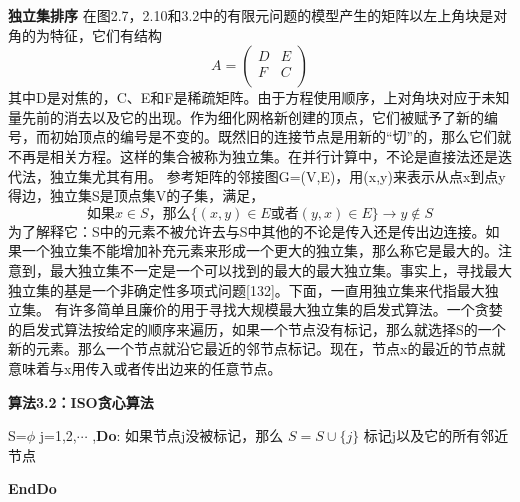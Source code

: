 \documentclass{article}
\begin{document}
\textbf{独立集排序}
在图2.7，2.10和3.2中的有限元问题的模型产生的矩阵以左上角块是对角的为特征，它们有结构
\begin{equation}
A=
\left (                 
\begin{array}{cc}   
    D&E\\  
    F&C \\ 
\end{array}
\right)   
\tag{3.3}
\end{equation}
其中D是对焦的，C、E和F是稀疏矩阵。由于方程使用顺序，上对角块对应于未知量先前的消去以及它的出现。作为细化网格新创建的顶点，它们被赋予了新的编号，而初始顶点的编号是不变的。既然旧的连接节点是用新的“切”的，那么它们就不再是相关方程。这样的集合被称为独立集。在并行计算中，不论是直接法还是迭代法，独立集尤其有用。
\newline
参考矩阵的邻接图G=(V,E)，用(x,y)来表示从点x到点y得边，独立集S是顶点集V的子集，满足，
$$\text{如果}x\in S\text{，那么}\{(x,y)\in E \text{或者} (y,x)\in E\} \rightarrow y \notin S$$
为了解释它：S中的元素不被允许去与S中其他的不论是传入还是传出边连接。如果一个独立集不能增加补充元素来形成一个更大的独立集，那么称它是最大的。注意到，最大独立集不一定是一个可以找到的最大的最大独立集。事实上，寻找最大独立集的基是一个非确定性多项式问题[132]。下面，一直用独立集来代指最大独立集。
\newline
有许多简单且廉价的用于寻找大规模最大独立集的启发式算法。一个贪婪的启发式算法按给定的顺序来遍历，如果一个节点没有标记，那么就选择S的一个新的元素。那么一个节点就沿它最近的邻节点标记。现在，节点x的最近的节点就意味着与x用传入或者传出边来的任意节点。


\textbf{算法3.2：ISO贪心算法}
\begin{codebox}

\li S=$\phi$
\li  \For j=1,2,$\cdots$  ,\textbf{Do}: 
\li       	如果节点j没被标记，那么
\li        	$S=S\cup \{ j\}$
\li            	标记j以及它的所有邻近节点
\li       

        \End
        \li \textbf{EndDo} 
\end{codebox}
\end{document}
